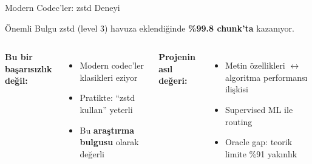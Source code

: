 \documentclass[10pt,aspectratio=43]{beamer}
\begin{document}
\begin{frame}{Modern Codec'ler: zstd Deneyi}
  \begin{alertblock}{Önemli Bulgu}
    zstd (level 3) havuza eklendiğinde \textbf{\%99.8 chunk'ta} kazanıyor.
  \end{alertblock}

  \vspace{0.5em}
  \begin{columns}[T]
    \textbf{Bu bir başarısızlık değil:}
    \vspace{0.3em}
    \begin{itemize}
      \setlength{\itemsep}{0.4em}
      \item Modern codec'ler klasikleri eziyor
      \item Pratikte: ``zstd kullan'' yeterli
      \item Bu \textbf{araştırma bulgusu} olarak değerli
    \end{itemize}

    \textbf{Projenin asıl değeri:}
    \vspace{0.3em}
    \begin{itemize}
      \setlength{\itemsep}{0.4em}
      \item Metin özellikleri $\leftrightarrow$ algoritma performansı ilişkisi
      \item Supervised ML ile routing
      \item Oracle gap: teorik limite \%91 yakınlık
    \end{itemize}
  \end{columns}
\end{frame}
\end{document}
